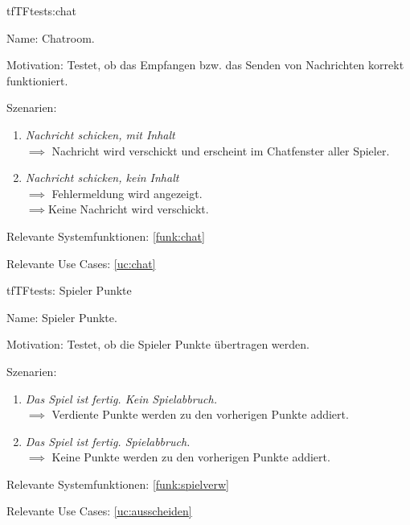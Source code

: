 \begin{description}[leftmargin=5em, style=sameline]

\begin{lhp}{tf}{TF}{tests:chat}
	\item [Name:] Chatroom.
	\item [Motivation:] Testet, ob das Empfangen bzw. das Senden von Nachrichten korrekt funktioniert.
	\item [Szenarien:] \hfill
		\begin{enumerate}
			\item \textit{Nachricht schicken, mit Inhalt} \\ $\implies$ Nachricht wird verschickt und erscheint im Chatfenster aller Spieler.
			\item \textit{Nachricht schicken, kein Inhalt} \\ $\implies$ Fehlermeldung wird angezeigt.
										\\ $\implies$Keine Nachricht wird verschickt.
		\end{enumerate}
	\item [Relevante Systemfunktionen:] \ref{funk:chat}
	\item [Relevante Use Cases:] \ref{uc:chat}
\end{lhp}

\end{description}


\begin{description}[leftmargin=5em, style=sameline]

\begin{lhp}{tf}{TF}{tests: Spieler Punkte}
	\item [Name:] Spieler Punkte.
	\item [Motivation:] Testet, ob die Spieler Punkte übertragen werden.
	\item [Szenarien:] \hfill
		\begin{enumerate}
			\item \textit{Das Spiel ist fertig. Kein Spielabbruch.} \\ $\implies$ Verdiente Punkte werden zu den vorherigen Punkte addiert.
			\item \textit{Das Spiel ist fertig. Spielabbruch.} \\ $\implies$ Keine Punkte werden zu den vorherigen Punkte addiert.
		\end{enumerate}
	\item [Relevante Systemfunktionen:] \ref{funk:spielverw}
	\item [Relevante Use Cases:] \ref{uc:ausscheiden}
\end{lhp}

\end{description}

